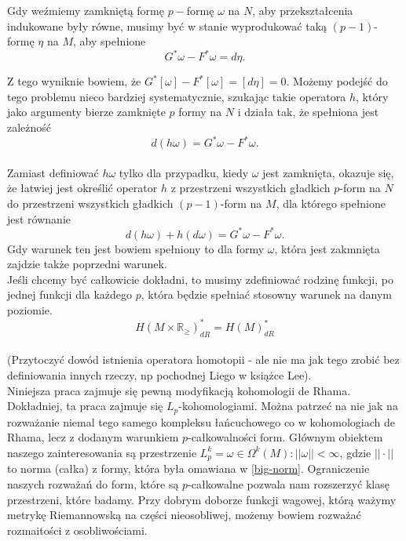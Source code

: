 \documentclass[licencjacka]{pracamgr}
\theoremstyle{definition}
\theoremstyle{definition}
\theoremstyle{plain}
\theoremstyle{plain}
\begin{document}
Gdy weźmiemy zamkniętą formę $p-$formę $\omega$ na $N$, aby
przekształcenia indukowane były równe, musimy być w stanie
wyprodukować taką $(p-1)$-formę $\eta$ na $M$, aby spełnione
\[
    G^\ast \omega - F^\ast \omega = d\eta.
\]

Z tego wyniknie bowiem, że
$ G^\ast [\omega] - F^\ast [\omega] =
[d\eta] = 0$.
Możemy podejść do tego problemu nieco bardziej systematycznie, 
szukając takie operatora
$h$, który jako argumenty bierze zamknięte $p$ formy na $N$
i działa tak, że spełniona jest zależność
\[
    d(h\omega) = G^\ast \omega - F^\ast \omega.
\] \\

Zamiast definiować $h \omega$ tylko dla przypadku, kiedy $\omega$
jest zamknięta, okazuje się, że łatwiej jest określić operator
$h$ z przestrzeni wszystkich gładkich $p$-form na $N$
do przestrzeni wszystkich gładkich $(p-1)$-form na $M$,
dla którego spełnione jest równanie
\[
    d(h\omega) + h(d\omega) = G^\ast \omega - F^\ast \omega.
\]
Gdy warunek ten jest bowiem spełniony to dla formy $\omega$, która
jest zakmnięta zajdzie także poprzedni warunek. \\

Jeśli chcemy być całkowicie dokładni, to musimy
zdefiniować rodzinę funkcji, po jednej funkcji dla każdego $p$, która
będzie spełniać stosowny warunek na danym poziomie.
\[
    H(M \times \mathbb{R}_{\geq})_{dR}^\ast = H(M)_{dR}^\ast
\] \\


(Przytoczyć dowód istnienia operatora homotopii - ale nie ma jak tego zrobić bez
definiowania innych rzeczy, np pochodnej Liego w książce Lee). \\


Niniejsza praca zajmuje się pewną modyfikacją kohomologii de Rhama.
Dokładniej, ta praca zajmuje się $L_p$-kohomologiami. Można patrzeć
na nie jak na rozważanie niemal tego samego kompleksu łańcuchowego co w
kohomologiach de Rhama, lecz z dodanym warunkiem $p$-całkowalności form. Głównym
obiektem naszego zainteresowania są przestrzenie 
$L_p^k = {\omega \in \Omega^k(M): ||\omega|| <\infty}$, gdzie $|| \cdot ||$
to norma (całka) z formy, która była omawiana w \ref{big-norm}. Ograniczenie
naszych rozważań do form, które są $p$-całkowalne pozwala nam rozszerzyć
klasę przestrzeni, które badamy. Przy dobrym doborze funkcji wagowej, którą
ważymy metrykę Riemannowską na części nieosobliwej, możemy
bowiem rozważać rozmaitości z osobliwościami.\\
\end{document}
